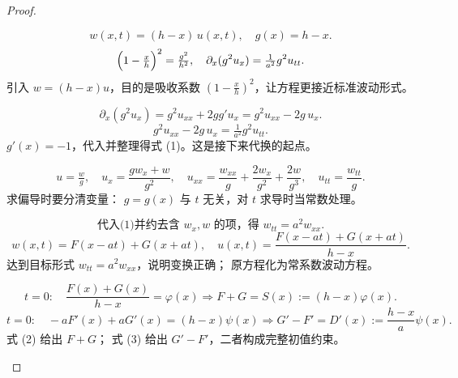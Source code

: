\begin{proof}

\begin{tcolorbox}[enhanced, breakable, sidebyside, lefthand ratio=0.65,
colback=white, colframe=gray!40, sharp corners]
\[
w(x,t)=(h-x)\,u(x,t),\quad g(x)=h-x.
\]
\[
\Bigl(1-\tfrac{x}{h}\Bigr)^2=\tfrac{g^2}{h^2},
\quad
\partial_x(g^2u_x)=\tfrac{1}{a^2}g^2u_{tt}.
\]
\tcblower
\textcolor{second}{引入 $w=(h-x)u$，目的是吸收系数 $(1-\tfrac{x}{h})^2$，让方程更接近标准波动形式。}
\end{tcolorbox}

\begin{tcolorbox}[enhanced, breakable, sidebyside, lefthand ratio=0.65,
colback=white, colframe=gray!40, sharp corners]
\[
\partial_x(g^2u_x)=g^2u_{xx}+2gg'u_x=g^2u_{xx}-2g\,u_x.
\]
\[
g^2u_{xx}-2g\,u_x=\tfrac{1}{a^2}g^2u_{tt}. \tag{1}
\]
\tcblower
\textcolor{second}{$g'(x)=-1$，代入并整理得式 (1)。这是接下来代换的起点。}
\end{tcolorbox}

\begin{tcolorbox}[enhanced, breakable, sidebyside, lefthand ratio=0.65,
colback=white, colframe=gray!40, sharp corners]
\[
u=\tfrac{w}{g},\quad
u_x=\frac{g w_x+w}{g^2},\quad
u_{xx}=\frac{w_{xx}}{g}+\frac{2w_x}{g^2}+\frac{2w}{g^3},\quad
u_{tt}=\frac{w_{tt}}{g}.
\]
\tcblower
\textcolor{second}{求偏导时要分清变量：
$g=g(x)$ 与 $t$ 无关，对 $t$ 求导时当常数处理。}
\end{tcolorbox}

\begin{tcolorbox}[enhanced, breakable, sidebyside, lefthand ratio=0.65,
colback=white, colframe=gray!40, sharp corners]
\[
\text{代入(1)并约去含 }w_x,w\text{ 的项，得 } 
w_{tt}=a^2w_{xx}.
\]
\[
w(x,t)=F(x-at)+G(x+at),\quad
u(x,t)=\frac{F(x-at)+G(x+at)}{h-x}.
\]
\tcblower
\textcolor{second}{达到目标形式 $w_{tt}=a^2w_{xx}$，说明变换正确；
原方程化为常系数波动方程。}
\end{tcolorbox}

\begin{tcolorbox}[enhanced, breakable, sidebyside, lefthand ratio=0.65,
colback=white, colframe=gray!40, sharp corners]
\[
t=0:\quad \frac{F(x)+G(x)}{h-x}=\varphi(x)
\Rightarrow F+G=S(x):=(h-x)\varphi(x). \tag{2}
\]
\[
t=0:\quad -aF'(x)+aG'(x)=(h-x)\psi(x)
\Rightarrow G'-F'=D'(x):=\frac{h-x}{a}\psi(x). \tag{3}
\]
\tcblower
\textcolor{second}{式 (2) 给出 $F+G$；
式 (3) 给出 $G'-F'$，二者构成完整初值约束。}
\end{tcolorbox}


\end{proof}
